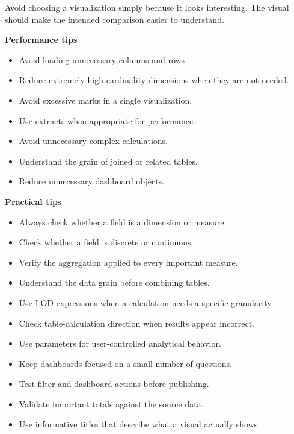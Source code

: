\documentclass[11pt,letterpaper]{article}
\begin{document}
Avoid choosing a visualization simply because it looks interesting. The
visual should make the intended comparison easier to understand.



\textbf{Performance tips}

\begin{itemize}[leftmargin=*]
    \item Avoid loading unnecessary columns and rows.
    \item Reduce extremely high-cardinality dimensions when they are not needed.
    \item Avoid excessive marks in a single visualization.
    \item Use extracts when appropriate for performance.
    \item Avoid unnecessary complex calculations.
    \item Understand the grain of joined or related tables.
    \item Reduce unnecessary dashboard objects.
\end{itemize}



\textbf{Practical tips}

\begin{itemize}[leftmargin=*]
    \item Always check whether a field is a dimension or measure.
    \item Check whether a field is discrete or continuous.
    \item Verify the aggregation applied to every important measure.
    \item Understand the data grain before combining tables.
    \item Use LOD expressions when a calculation needs a specific granularity.
    \item Check table-calculation direction when results appear incorrect.
    \item Use parameters for user-controlled analytical behavior.
    \item Keep dashboards focused on a small number of questions.
    \item Test filter and dashboard actions before publishing.
    \item Validate important totals against the source data.
    \item Use informative titles that describe what a visual actually shows.
\end{itemize}
\end{document}

